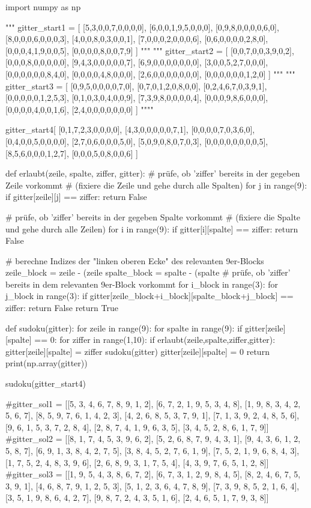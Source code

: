 import numpy as np

"""
gitter_start1 = [
[5,3,0,0,7,0,0,0,0],
[6,0,0,1,9,5,0,0,0],
[0,9,8,0,0,0,0,6,0],
[8,0,0,0,6,0,0,0,3],
[4,0,0,8,0,3,0,0,1],
[7,0,0,0,2,0,0,0,6],
[0,6,0,0,0,0,2,8,0],
[0,0,0,4,1,9,0,0,5],
[0,0,0,0,8,0,0,7,9]
]
"""
"""
gitter_start2 = [
[0,0,7,0,0,3,9,0,2],
[0,0,0,8,0,0,0,0,0],
[9,4,3,0,0,0,0,0,7],
[6,9,0,0,0,0,0,0,0],
[3,0,0,5,2,7,0,0,0],
[0,0,0,0,0,0,8,4,0],
[0,0,0,0,4,8,0,0,0],
[2,6,0,0,0,0,0,0,0],
[0,0,0,0,0,0,1,2,0]
]
"""
"""
gitter_start3 = [
[0,9,5,0,0,0,0,7,0],
[0,7,0,1,2,0,8,0,0],
[0,2,4,6,7,0,3,9,1],
[0,0,0,0,0,1,2,5,3],
[0,1,0,3,0,4,0,0,9],
[7,3,9,8,0,0,0,0,4],
[0,0,0,9,8,6,0,0,0],
[0,0,0,0,4,0,0,1,6],
[2,4,0,0,0,0,0,0,0]
]
""""


gitter_start4[
[0,1,7,2,3,0,0,0,0],
[4,3,0,0,0,0,0,7,1],
[0,0,0,0,7,0,3,6,0],
[0,4,0,0,5,0,0,0,0],
[2,7,0,6,0,0,0,5,0],
[5,0,9,0,8,0,7,0,3],
[0,0,0,0,0,0,0,0,5],
[8,5,6,0,0,0,1,2,7],
[0,0,0,5,0,8,0,0,6]
]

def erlaubt(zeile, spalte, ziffer, gitter):
    # prüfe, ob 'ziffer' bereits in der gegeben Zeile vorkommt
    # (fixiere die Zeile und gehe durch alle Spalten)
    for j in range(9):
        if gitter[zeile][j] == ziffer:
            return False

    # prüfe, ob 'ziffer' bereits in der gegeben Spalte vorkommt
    # (fixiere die Spalte und gehe durch alle Zeilen)
    for i in range(9):
        if gitter[i][spalte] == ziffer:
            return False

    # berechne Indizes der "linken oberen Ecke" des relevanten 9er-Blocks
    zeile_block = zeile - (zeile %
    spalte_block = spalte - (spalte %
    # prüfe, ob 'ziffer' bereits in dem relevanten 9er-Block vorkommt
    for i_block in range(3):
        for j_block in range(3):
            if gitter[zeile_block+i_block][spalte_block+j_block] == ziffer:
                return False
    return True

def sudoku(gitter):
    for zeile in range(9):
        for spalte in range(9):
            if gitter[zeile][spalte] == 0:
                for ziffer in range(1,10):
                    if erlaubt(zeile,spalte,ziffer,gitter):
                        gitter[zeile][spalte] = ziffer
                        sudoku(gitter)
                        gitter[zeile][spalte] = 0
                return
    print(np.array(gitter))

sudoku(gitter_start4)

#gitter_sol1 = [[5, 3, 4, 6, 7, 8, 9, 1, 2], [6, 7, 2, 1, 9, 5, 3, 4, 8], [1, 9, 8, 3, 4, 2, 5, 6, 7], [8, 5, 9, 7, 6, 1, 4, 2, 3], [4, 2, 6, 8, 5, 3, 7, 9, 1], [7, 1, 3, 9, 2, 4, 8, 5, 6], [9, 6, 1, 5, 3, 7, 2, 8, 4], [2, 8, 7, 4, 1, 9, 6, 3, 5], [3, 4, 5, 2, 8, 6, 1, 7, 9]]
#gitter_sol2 = [[8, 1, 7, 4, 5, 3, 9, 6, 2], [5, 2, 6, 8, 7, 9, 4, 3, 1], [9, 4, 3, 6, 1, 2, 5, 8, 7], [6, 9, 1, 3, 8, 4, 2, 7, 5], [3, 8, 4, 5, 2, 7, 6, 1, 9], [7, 5, 2, 1, 9, 6, 8, 4, 3], [1, 7, 5, 2, 4, 8, 3, 9, 6], [2, 6, 8, 9, 3, 1, 7, 5, 4], [4, 3, 9, 7, 6, 5, 1, 2, 8]]
#gitter_sol3 = [[1, 9, 5, 4, 3, 8, 6, 7, 2], [6, 7, 3, 1, 2, 9, 8, 4, 5], [8, 2, 4, 6, 7, 5, 3, 9, 1], [4, 6, 8, 7, 9, 1, 2, 5, 3], [5, 1, 2, 3, 6, 4, 7, 8, 9], [7, 3, 9, 8, 5, 2, 1, 6, 4], [3, 5, 1, 9, 8, 6, 4, 2, 7], [9, 8, 7, 2, 4, 3, 5, 1, 6], [2, 4, 6, 5, 1, 7, 9, 3, 8]]

